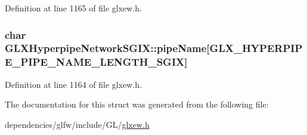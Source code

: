 Definition at line 1165 of file glxew.\-h.

\hypertarget{struct_g_l_x_hyperpipe_network_s_g_i_x_a6338b9717fa895aec16b932f2ef693ed}{
\subsubsection[{pipe\-Name}]{\setlength{\rightskip}{0pt plus 5cm}char G\-L\-X\-Hyperpipe\-Network\-S\-G\-I\-X\-::pipe\-Name\mbox{[}{\bf G\-L\-X\-\_\-\-H\-Y\-P\-E\-R\-P\-I\-P\-E\-\_\-\-P\-I\-P\-E\-\_\-\-N\-A\-M\-E\-\_\-\-L\-E\-N\-G\-T\-H\-\_\-\-S\-G\-I\-X}\mbox{]}}}\label{struct_g_l_x_hyperpipe_network_s_g_i_x_a6338b9717fa895aec16b932f2ef693ed}


Definition at line 1164 of file glxew.\-h.



The documentation for this struct was generated from the following file\-:\begin{DoxyCompactItemize}
\item 
dependencies/glfw/include/\-G\-L/\hyperlink{glxew_8h}{glxew.\-h}\end{DoxyCompactItemize}
